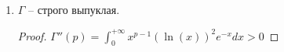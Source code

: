 \begin{properties}
\begin{enumerate}
{            \begin{proof}
                Надо обосновать дифф. под знаком интеграла. Для этого надо потребовать равномерную сх-ть полученного интеграла.
                
                $0 < a \leq p \leq b < +\infty$
                
                \begin{enumerate}
                    \item {
                        $0 \leq x \leq 1$:

                        $x^{a-1} |\ln(x)|^{n} e^{-x}$
                    }
                    \item {
                        $1 \leq x$:

                        $x^{b-1} |\ln(x)|^{n} e^{-x} \leq x^{n + b} e^{-x}$
                    }
                \end{enumerate}
            \end{proof}
        }
        \item {
            $\Gamma$ -- строго выпуклая.

            \begin{proof}
                $\Gamma''(p) = \int_{0}^{+\infty} { x^{p-1} (\ln(x))^2 e^{-x} dx } > 0$
            \end{proof}
        }
    \end{enumerate}
\end{properties}

